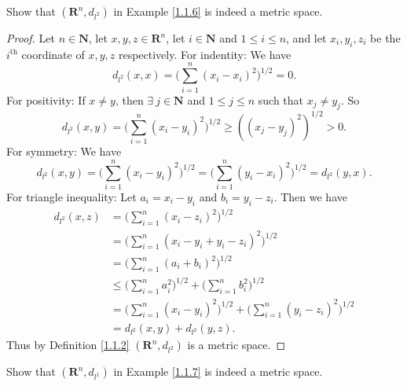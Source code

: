 \begin{exercise}\label{ex 1.1.6}
    Show that \((\mathbf{R}^n, d_{l^2})\) in Example \ref{1.1.6} is indeed a metric space.
\end{exercise}

\begin{proof}
    Let \(n \in \mathbf{N}\), let \(x, y, z \in \mathbf{R}^n\), let \(i \in \mathbf{N}\) and \(1 \leq i \leq n\), and let \(x_i, y_i, z_i\) be the \(i^{\text{th}}\) coordinate of \(x, y, z\) respectively.
    For indentity:
    We have
    \[
        d_{l^2}(x, x) = \bigg(\sum_{i = 1}^n (x_i - x_i)^2\bigg)^{1 / 2} = 0.
    \]
    For positivity:
    If \(x \neq y\), then \(\exists\ j \in \mathbf{N}\) and \(1 \leq j \leq n\) such that \(x_j \neq y_j\).
    So
    \[
        d_{l^2}(x, y) = \bigg(\sum_{i = 1}^n (x_i - y_i)^2\bigg)^{1 / 2} \geq ((x_j - y_j)^2)^{1 / 2} > 0.
    \]
    For symmetry:
    We have
    \[
        d_{l^2}(x, y) = \bigg(\sum_{i = 1}^n (x_i - y_i)^2\bigg)^{1 / 2} = \bigg(\sum_{i = 1}^n (y_i - x_i)^2\bigg)^{1 / 2} = d_{l^2}(y, x).
    \]
    For triangle inequality:
    Let \(a_i = x_i - y_i\) and \(b_i = y_i - z_i\).
    Then we have
    \begin{align*}
        d_{l^2}(x, z) & = \bigg(\sum_{i = 1}^n (x_i - z_i)^2\bigg)^{1 / 2}                                                    \\
                      & = \bigg(\sum_{i = 1}^n (x_i - y_i + y_i - z_i)^2\bigg)^{1 / 2}                                        \\
                      & = \bigg(\sum_{i = 1}^n (a_i + b_i)^2\bigg)^{1 / 2}                                                    \\
                      & \leq \bigg(\sum_{i = 1}^n a_i^2\bigg)^{1 / 2} + \bigg(\sum_{i = 1}^n b_i^2\bigg)^{1 / 2}              \\
                      & = \bigg(\sum_{i = 1}^n (x_i - y_i)^2\bigg)^{1 / 2} + \bigg(\sum_{i = 1}^n (y_i - z_i)^2\bigg)^{1 / 2} \\
                      & = d_{l^2}(x, y) + d_{l^2}(y, z).
    \end{align*}
    Thus by Definition \ref{1.1.2} \((\mathbf{R}^n, d_{l^2})\) is a metric space.
\end{proof}

\begin{exercise}\label{ex 1.1.7}
    Show that \((\mathbf{R}^n, d_{l^1})\) in Example \ref{1.1.7} is indeed a metric space.
\end{exercise}

